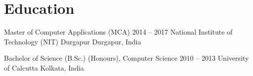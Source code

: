 \section{Education}
  \resumeSubHeadingListStart
    \resumeSubheading
      {Master of Computer Applications (MCA)} {2014 -- 2017}
      {National Institute of Technology (NIT) Durgapur} {Durgapur, India}
    
    \resumeSubheading
      {Bachelor of Science (B.Sc.) (Honours), Computer Science} {2010 -- 2013}
      {University of Calcutta} {Kolkata, India}
  \resumeSubHeadingListEnd